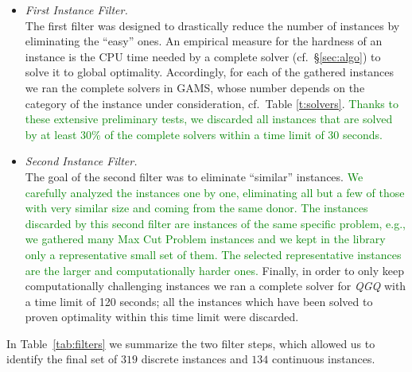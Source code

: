 \begin{itemize}
 \item \emph{First Instance Filter.}\\
       The first filter was designed to drastically reduce the number of
       instances by eliminating the ``easy'' ones. An empirical measure
       for the hardness of an instance is the CPU time needed by a
       complete solver (cf.~\S\ref{sec:algo}) to solve it to
       global optimality. Accordingly, for each of the gathered instances we
       ran the complete solvers in GAMS, whose number depends on the category
       of the instance under consideration, cf.~Table \ref{t:solvers}.
       \textcolor{green}{Thanks to these extensive preliminary tests, we discarded all instances
       that are solved by at least 30\% of the complete solvers within a time
       limit of 30 seconds.}
 \item \emph{Second Instance Filter.}\\
       The goal of the second filter was to eliminate ``similar'' instances.
       \textcolor{green}{We carefully analyzed the instances one by one,
        eliminating all but a few of those with very similar size and coming from the same donor.
       The instances discarded by this second filter are instances of the same specific problem, e.g., we gathered many Max Cut Problem instances and we kept in the library only a representative small set of them. The selected representative instances are the larger and computationally harder ones.}
       Finally, in order to only
       keep computationally challenging instances we ran a complete solver for \textit{QGQ} with a time limit of 120 seconds; all the
       instances which have been solved to proven optimality within this time limit
       were discarded.
\end{itemize}
%
In Table~\ref{tab:filters} we summarize the two filter steps, which
allowed us to identify the final set of $319$ discrete instances and
$134$ continuous instances.

